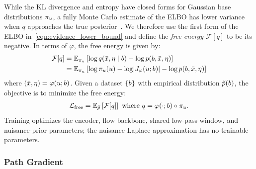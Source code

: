 While the \gls*{KL} divergence and entropy have closed forms for Gaussian base distributions $\pi_{u}$, a fully Monte Carlo estimate of the \gls*{ELBO} has lower variance when $q$ approaches the true posterior~\citep{roeder_sticking_2017}.
We therefore use the first form of the \gls*{ELBO} in~\eqref{eqn:evidence_lower_bound} and define the \textit{free energy} $\mathcal{F} [q]$ to be its negative.
In terms of $\varphi$, the free energy is given by:
\begin{align}\label{eqn:free_energy_joint_flow}
    \begin{split}
        \mathcal{F} [q] & = \mathbb{E}_{\pi_{\vv{u}}} \left[ \log q(\bar{\distbn}, \eta \mid \signal) - \log p(\signal, \bar{\distbn}, \eta) \right]                                      \\
        & = \mathbb{E}_{\pi_{\vv{u}}} \left[ \log \pi_{\vv{u}}(\vv{u}) - \log \AbsDet{\vv{J}_{\varphi}(\vv{u}; \signal)} - \log p(\signal, \bar{\distbn}, \eta) \right]
    \end{split}
\end{align}
where $(\bar{x}, \eta) = \varphi(u; b)$.
Given a dataset $\{b\}$ with empirical distribution $\tilde{p}(b)$, the objective is to minimize the free energy:
\begin{align}\label{eqn:free_energy_objective}
    \mathcal{L}_{\text{free}} = \mathbb{E}_{\tilde{p}} \left[ \mathcal{F} [q] \right] \text{ where } q = \varphi(\cdot; b) \circ \pi_{u}.
\end{align}
Training optimizes the encoder, flow backbone, shared low-pass window, and nuisance-prior parameters;
the nuisance Laplace approximation has no trainable parameters.

\subsubsection{Path Gradient}

